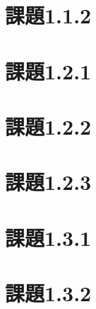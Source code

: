 \documentclass[uplatex, dvipdfmx, 11pt,a4j, titlepage]{jsarticle}
\begin{document}
\section{課題1.1.2}



\newpage


\subtitle{2020/10/*}

\section{課題1.2.1}
\section{課題1.2.2}
\section{課題1.2.3}

\newpage



\subtitle{2019/*/*}

\section{課題1.3.1}
\section{課題1.3.2}


\newpage
\thispagestyle{empty}
\nocite{key1}
\nocite{key2}


\end{document}
